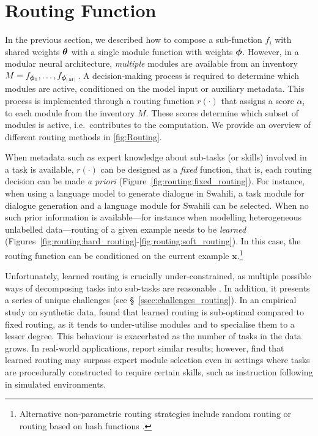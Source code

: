 \documentclass[10pt]{article} %
\begin{document}
\section{Routing Function}
\label{sec:routing}
In the previous section, we described how to compose a sub-function $f_i$ with shared weights ${\bm{\theta}}$ with a single module function with weights ${\bm{\phi}}$. However, in a modular neural architecture, \textit{multiple} modules are available from an inventory 
$M = f_{{\bm{\phi}}_1}, \dots, f_{{\bm{\phi}}_{|M|}}$.
A decision-making process is required to determine which modules are active, conditioned on the model input or auxiliary metadata. This process is implemented through a routing function $r(\cdot)$ that assigns a score $\alpha_i$ to each module from the inventory $M$. These scores determine which subset of modules is active, i.e.\ contributes to the computation.
We provide an overview of different routing methods in \cref{fig:Routing}.

When metadata such as expert knowledge about sub-tasks (or skills) involved in a task is available, $r(\cdot)$ can be designed as a \textit{fixed} function, that is, each routing decision can be made \textit{a priori} (Figure~\ref{fig:routing:fixed_routing}). For instance, when using a language model to generate dialogue in Swahili, a task module for dialogue generation and a language module for Swahili can be selected. When no such prior information is available---for instance when modelling heterogeneous unlabelled data---routing of a given example needs to be \textit{learned} (Figures~\ref{fig:routing:hard_routing}-\ref{fig:routing:soft_routing}). In this case, the routing function can be conditioned on  the current example $\mathbf{x}$.\footnote{Alternative non-parametric routing strategies include random routing \citep{Zuo2022Taming, Wang2022AdaMix} or routing based on hash functions \citep{Roller2021Hash}.} 


Unfortunately, learned routing is crucially under-constrained, as multiple possible ways of decomposing tasks into sub-tasks are reasonable \citep{jacobs1991task}. In addition, it presents a series of unique challenges (see \S~\ref{ssec:challenges_routing}). In an empirical study on synthetic data, \citet{mittal2022is} found that learned routing is sub-optimal compared to fixed routing, as it tends to under-utilise modules and to specialise them to a lesser degree. This behaviour is exacerbated as the number of tasks in the data grows. In real-world applications, \citet{Muqeeth2022Models} report similar results; however, \citet{ponti2022combining} find that learned routing may surpass expert module selection even in settings where tasks are procedurally constructed to require certain skills, such as instruction following in simulated environments.
\end{document}
